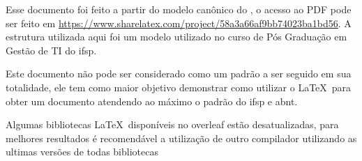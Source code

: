 \newcommand{\urlmodelosimples}{https://www.sharelatex.com/project/58a3a66af9bb74023ba1bd56}

\newcommand{\urlmodelo}{\url{\urlmodelosimples}}

Esse documento foi feito a partir do modelo canônico do \abnTeX, o acesso ao PDF pode ser feito em 
\urlmodelo. A estrutura utilizada aqui foi um modelo utilizado no curso de Pós Graduação em Gestão de TI do \ac{ifsp}.



Este documento não pode ser considerado como um padrão a ser seguido em sua totalidade, ele tem como maior objetivo demonstrar como utilizar o \LaTeX\ para obter um documento atendendo ao máximo o padrão do \ac{ifsp} e \ac{abnt}.

Algumas bibliotecas \LaTeX\ disponíveis no overleaf estão desatualizadas, para melhores resultados é recomendável a utilização de outro compilador utilizando as ultimas versões de todas bibliotecas



\noindent\hrulefill



\newpage
